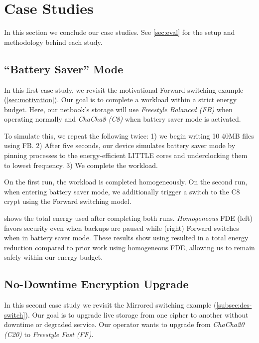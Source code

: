 \section{Case Studies}\label{sec:usecases}

In this section we conclude our case studies. See \cref{sec:eval} for the setup
and methodology behind each study.


\subsection{``Battery Saver'' Mode}\label{subsec:usecase-battery}

In this first case study, we revisit the motivational Forward switching example
(\cref{sec:motivation}). Our goal is to complete a workload within a strict
energy budget. Here, our netbook's storage will use {\em Freestyle Balanced (FB)}
when operating normally and {\em ChaCha8 (C8)} when battery saver mode is
activated.



To simulate this, we repeat the following twice: 1) we begin writing 10 40MB
files using FB. 2) After five seconds, our device simulates battery saver mode
by pinning \sys processes to the energy-efficient LITTLE cores and underclocking
them to lowest frequency. 3) We complete the workload.

On the first run, the workload is completed homogeneously. On the second run,
when entering battery saver mode, we additionally trigger a switch to the C8
crypt using the Forward switching model.

 shows the total energy used after completing both
runs. {\em Homogeneous} FDE (left) favors security even when backups are paused
while \sys (right) Forward switches when in battery saver mode. These results
show using \sys resulted in a  total energy reduction compared to
prior work using homogeneous FDE, allowing us to remain safely within our energy
budget.


\subsection{No-Downtime Encryption Upgrade}\label{subsec:usecase-upgrade}

In this second case study we revisit the Mirrored switching example
(\cref{subsec:des-switch}). Our goal is to upgrade live storage from one cipher
to another without downtime or degraded service. Our operator wants to upgrade
from {\em ChaCha20 (C20)} to {\em Freestyle Fast (FF)}.

